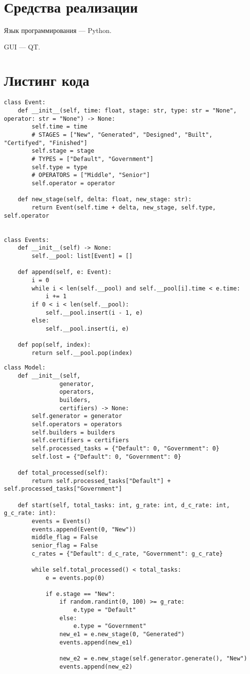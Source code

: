 \section*{Средства реализации}

Язык программирования --- Python.

GUI --- QT.

\clearpage

\section*{Листинг кода}

\begin{lstlisting}
class Event:
	def __init__(self, time: float, stage: str, type: str = "None", operator: str = "None") -> None:
		self.time = time
		# STAGES = ["New", "Generated", "Designed", "Built", "Certifyed", "Finished"]
		self.stage = stage
		# TYPES = ["Default", "Government"]
		self.type = type
		# OPERATORS = ["Middle", "Senior"]
		self.operator = operator

	def new_stage(self, delta: float, new_stage: str):
		return Event(self.time + delta, new_stage, self.type, self.operator


class Events:
	def __init__(self) -> None:
		self.__pool: list[Event] = []
	
	def append(self, e: Event):
		i = 0
		while i < len(self.__pool) and self.__pool[i].time < e.time:
			i += 1
		if 0 < i < len(self.__pool):
			self.__pool.insert(i - 1, e)
		else:
			self.__pool.insert(i, e)
		
	def pop(self, index):
		return self.__pool.pop(index)
\end{lstlisting}

\clearpage

\begin{lstlisting}
class Model:
	def __init__(self,
				generator,
				operators,
				builders,
				certifiers) -> None:
		self.generator = generator
		self.operators = operators
		self.builders = builders
		self.certifiers = certifiers
		self.processed_tasks = {"Default": 0, "Government": 0}
		self.lost = {"Default": 0, "Government": 0}

	def total_processed(self):
		return self.processed_tasks["Default"] + self.processed_tasks["Government"]
	
	def start(self, total_tasks: int, g_rate: int, d_c_rate: int, g_c_rate: int):
		events = Events()
		events.append(Event(0, "New"))
		middle_flag = False
		senior_flag = False
		c_rates = {"Default": d_c_rate, "Government": g_c_rate}
		
		while self.total_processed() < total_tasks:
			e = events.pop(0)
			
			if e.stage == "New":
				if random.randint(0, 100) >= g_rate:
					e.type = "Default"
				else:
					e.type = "Government"
				new_e1 = e.new_stage(0, "Generated")
				events.append(new_e1)
				
				new_e2 = e.new_stage(self.generator.generate(),	"New")
				events.append(new_e2)
\end{lstlisting}

